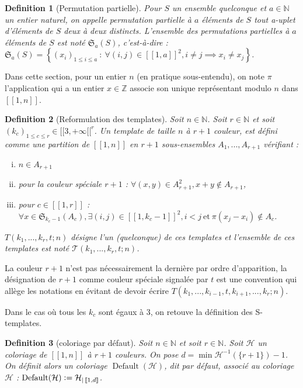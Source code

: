 \documentclass{article}
\newtheorem{definition}{Definition}[section]
\DeclareMathOperator{\findef}{Default}
\newcommand{\defeq}{\vcentcolon=}
\begin{document}
\begin{definition}[Permutation partielle]
Pour \(S\) un ensemble quelconque et \(a \in \mathbb{N}\) un entier naturel, on appelle permutation partielle à \(a\) éléments de \(S\) tout a-uplet d'éléments de \(S\) deux à deux distincts. L'ensemble des permutations partielles à \(a\) éléments de \(S\) est noté \(\mathfrak{S}_a(S)\), c'est-à-dire : \(\mathfrak{S}_a(S) = \left\{ (x_i)_{1 \leqslant i \leqslant a} ~:~ \forall (i, j) \in [\![1, a]\!]^2, i \neq j \implies x_i \neq x_j \right\}\).
\end{definition}

Dans cette section, pour un entier \(n\) (en pratique sous-entendu), on note \(\pi\) l'application qui a un entier \(x \in \mathbb{Z}\) associe son unique représentant modulo \(n\) dans \([\![1, n]\!]\).

\begin{definition}[Reformulation des templates]
Soit \(n \in \mathbb{N}\). Soit \(r \in \mathbb{N}\) et soit \((k_c)_{1 \leqslant c \leqslant r} \in {[\![3, +\infty[\![}^r\). Un template de taille \(n\) à \(r + 1\) couleur, est défini comme une partition de \([\![1, n]\!]\) en \(r+1\) sous-ensembles \(A_1, ..., A_{r+1}\) vérifiant : 
\begin{enumerate}[(i)]
\item \(n \in A_{r+1}\)
\item pour la couleur spéciale \(r + 1\) : \(\forall (x,y) \in A_{r+1}^2, x + y \notin A_{r+1}\),
\item pour \(c \in [\![1, r]\!]\) : \(\forall x \in \mathfrak{S}_{k_c - 1}(A_c), \exists (i, j) \in {[\![1, k_c - 1]\!]}^2, i < j ~\text{et}~ \pi(x_j - x_i) \notin A_c\).
\end{enumerate}
 \(T(k_1, ..., k_r, t; n)\) désigne l'un (quelconque) de ces templates et l'ensemble de ces templates est noté \(\mathcal{T}(k_1, ..., k_r, t; n)\).
\end{definition}

La couleur \(r + 1\)  n'est pas nécessairement la dernière par ordre d'apparition, la désignation de \(r+1\) comme couleur spéciale signalée par \(t\) est une convention qui allège les notations en évitant de devoir écrire \(T(k_1, ..., k_{i - 1}, t,  k_{i + 1}, ..., k_r; n)\).

Dans le cas où tous les \(k_c\) sont égaux à 3, on retouve la définition des S-templates.

\begin{definition}[coloriage par défaut]
Soit \(n \in \mathbb{N}\) et soit \(r \in \mathbb{N}\). Soit \(\mathcal{H}\) un coloriage de \([\![1, n]\!]\) à \(r +1\) couleurs. On pose \(d = \min \mathcal{H}^{-1}(\{r + 1\}) - 1\). On définit alors un coloriage \(\findef(\mathcal{H})\), dit par défaut, associé au coloriage \(\mathcal{H}\) : \(\findef(\mathcal{H}) \defeq \mathcal{H}_{|\,[\![1, d]\!]}\).
\end{definition}
\end{document}
